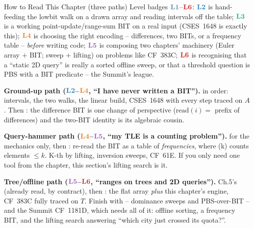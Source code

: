 \begin{chaptertheorybox}{How to Read This Chapter (three paths)}
Level badges \(\lv1\)--\(\lv6\): \(\lv2\) is hand-feeding the lowbit walk on
a drawn array and reading intervals off the table; \(\lv3\) is a working
point-update/range-sum BIT on a real input (CSES~1648 is exactly this);
\(\lv4\) is choosing the right encoding -- differences, two BITs, or a
frequency table -- \emph{before} writing code; \(\lv5\) is composing two
chapters' machinery (Euler array \(+\) BIT; sweep \(+\) lifting) on problems
like CF~383C; \(\lv6\) is recognising that a ``static 2D query'' is really a
sorted offline sweep, or that a threshold question is PBS with a BIT
predicate -- the Summit's league.

\textbf{Ground-up path (\(\lv2\)--\(\lv4\), ``I have never written a BIT'').}
 in order: intervals, the two walks, the linear build,
CSES~1648 with every step traced on \(A\).  Then : the
difference BIT is one change of perspective (\(\text{read}(i)=\) prefix of
differences) and the two-BIT identity is its algebraic cousin.

\textbf{Query-hammer path (\(\lv4\)--\(\lv5\), ``my TLE is a counting
problem'').}   for the mechanics only, then
: re-read the BIT as a table of \emph{frequencies}, where
(k) counts elements \(\le k\).  K-th by lifting, inversion
sweeps, CF~61E.  If you only need one tool from the chapter, this section's
lifting search is it.

\textbf{Tree/offline path (\(\lv5\)--\(\lv6\), ``ranges on trees and
2D queries'').}  Ch.5's  (already read, by contract),
then : the flat array \emph{plus} this chapter's engine,
CF~383C fully traced on \(T\).  Finish with  --
dominance sweeps and PBS-over-BIT -- and the Summit CF~1181D, which needs
all of it: offline sorting, a frequency BIT, and the lifting search
answering ``which city just crossed its quota?''.
\end{chaptertheorybox}

